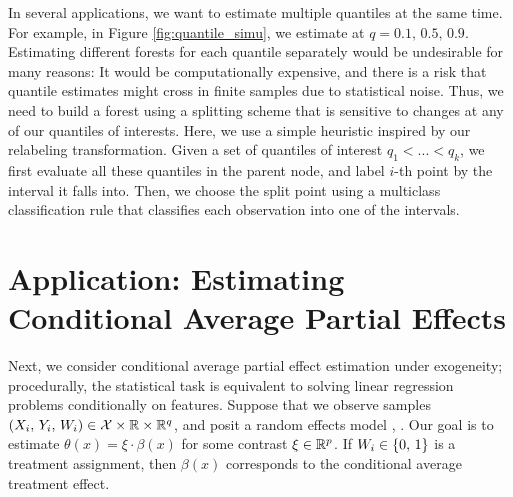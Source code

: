 \documentclass[aos]{imsart}
\theoremstyle{plain}
\theoremstyle{definition}
\theoremstyle{remark}
\begin{document}
\begin{CJK}{UTF8}{gbsn}
In several applications, we want to estimate multiple quantiles
at the same time. For example, in Figure \ref{fig:quantile_simu}, we estimate at $q = 0.1, \, 0.5, \, 0.9$.
Estimating different forests for each quantile separately would be undesirable
for many reasons: It would be computationally expensive, and there is a risk that quantile
estimates might cross in finite samples due to statistical noise. Thus, we need to build a forest using
a splitting scheme that is sensitive to changes at any of our quantiles of interests.
Here, we use a simple heuristic inspired by our relabeling transformation.
Given a set of quantiles of interest $q_1 < ... < q_k$, we first evaluate all these quantiles
  in the parent node, and label $i$-th point by the
interval \smash{$[\htheta_{q_{j - 1}, P(X_i)}, \, \htheta_{q_{j}, P(X_i)})$} it falls into. Then, we choose the
split point using a multiclass classification rule that classifies each observation into one of the intervals.


\section{Application: Estimating Conditional Average Partial Effects}
\label{sec:cape}

Next, we consider conditional average partial effect estimation under
exogeneity; procedurally, the statistical task is equivalent to solving linear regression problems
conditionally on features. Suppose that we observe samples
$(X_i, \, Y_i, \, W_i) \in \mathcal{X} \times \mathbb{R} \times \mathbb{R}^q$, and posit a random effects model
, .
Our goal is to estimate $\theta(x) = \xi \cdot \beta(x)$ for some contrast $\xi \in \mathbb{R}^p$.
If $W_i \in \left\{0, \, 1\right\}$ is a treatment assignment, then $\beta(x)$ corresponds to the
conditional average treatment effect.


\end{CJK}
\end{document}
